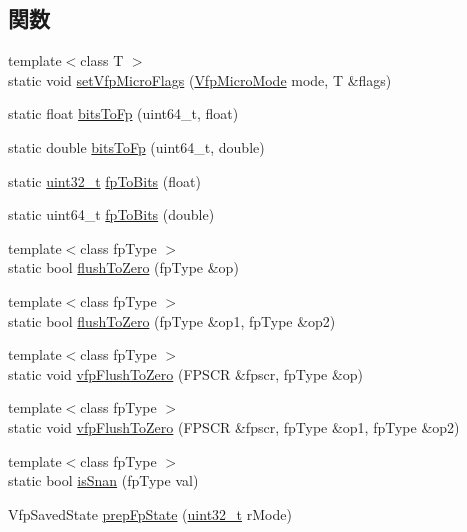 \subsection*{関数}
\begin{DoxyCompactItemize}
\item 
{\footnotesize template$<$class T $>$ }\\static void \hyperlink{namespaceArmISA_a19228cef06a6ad400f39e5e0fb35d0f2}{setVfpMicroFlags} (\hyperlink{namespaceArmISA_ad386ea556acd7cd538c64e2d73933714}{VfpMicroMode} mode, T \&flags)
\item 
static float \hyperlink{namespaceArmISA_a828474c1fbd138524af9b8d867e4d618}{bitsToFp} (uint64\_\-t, float)
\item 
static double \hyperlink{namespaceArmISA_a08179cd42057d9c90e99f0b0cb208b21}{bitsToFp} (uint64\_\-t, double)
\item 
static \hyperlink{Type_8hh_a435d1572bf3f880d55459d9805097f62}{uint32\_\-t} \hyperlink{namespaceArmISA_ad773e35e6eebe1fec525b1a67acfa787}{fpToBits} (float)
\item 
static uint64\_\-t \hyperlink{namespaceArmISA_a45d936448ac52ba40324648359764d94}{fpToBits} (double)
\item 
{\footnotesize template$<$class fpType $>$ }\\static bool \hyperlink{namespaceArmISA_a5b5e82a1922deef85d739eeb218cd370}{flushToZero} (fpType \&op)
\item 
{\footnotesize template$<$class fpType $>$ }\\static bool \hyperlink{namespaceArmISA_a9374729560224ba063a5cbbeb9c87da5}{flushToZero} (fpType \&op1, fpType \&op2)
\item 
{\footnotesize template$<$class fpType $>$ }\\static void \hyperlink{namespaceArmISA_a30b60f75a099a8618ac9761c28cbd7d6}{vfpFlushToZero} (FPSCR \&fpscr, fpType \&op)
\item 
{\footnotesize template$<$class fpType $>$ }\\static void \hyperlink{namespaceArmISA_a5d463b83c95a56432db92ea8a5050390}{vfpFlushToZero} (FPSCR \&fpscr, fpType \&op1, fpType \&op2)
\item 
{\footnotesize template$<$class fpType $>$ }\\static bool \hyperlink{namespaceArmISA_a4992cc3ca09ea31ebe62564d8141b43a}{isSnan} (fpType val)
\item 
VfpSavedState \hyperlink{namespaceArmISA_a428af4a4a3cbeefeeae99b8fa3a20632}{prepFpState} (\hyperlink{Type_8hh_a435d1572bf3f880d55459d9805097f62}{uint32\_\-t} rMode)

\end{DoxyCompactItemize}
